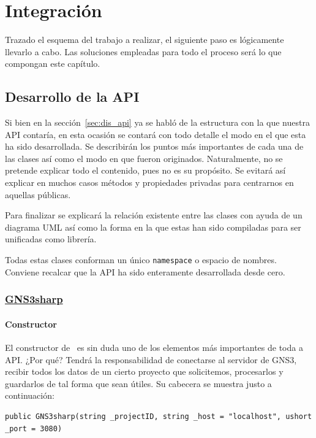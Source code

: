 \chapter{Integración}\label{chap:Integration}
Trazado el esquema del trabajo a realizar, el siguiente paso es lógicamente llevarlo a cabo. Las soluciones empleadas para todo el proceso será lo que compongan este capítulo.

\section{Desarrollo de la API}
Si bien en la sección~\ref{sec:dis_api} ya se habló de la estructura con la que nuestra API contaría, en esta ocasión se contará con todo detalle el modo en el que esta ha sido desarrollada. Se describirán los puntos más importantes de cada una de las clases así como el modo en que fueron originados. Naturalmente, no se pretende explicar todo el contenido, pues no es su propósito. Se evitará así explicar en muchos casos métodos y propiedades privadas para centrarnos en aquellas públicas.

Para finalizar se explicará la relación existente entre las clases con ayuda de un diagrama UML así como la forma en la que estas han sido compiladas para ser unificadas como librería.

Todas estas clases conforman un único \texttt{namespace} o espacio de nombres. Conviene recalcar que la API ha sido enteramente desarrollada desde cero.

\subsection[GNS3sharp]{\href{https://github.com/aorestr/GNS3sharp/blob/master/gsn3sharp.cs}{GNS3sharp}}\label{subsec:gnscsclass}
\subsubsection{Constructor}
El constructor de \GNSCS~es sin duda uno de los elementos más importantes de toda a API. ¿Por qué? Tendrá la responsabilidad de conectarse al servidor de GNS3, recibir todos los datos de un cierto proyecto que solicitemos, procesarlos y guardarlos de tal forma que sean útiles. Su cabecera se muestra justo a continuación:
\begin{lstlisting}[language={[Sharp]C}, caption={Cabecera del constructor de \texttt{GNS3sharp}}, label={gnscs1}]
public GNS3sharp(string _projectID, string _host = "localhost", ushort _port = 3080)
\end{lstlisting}

